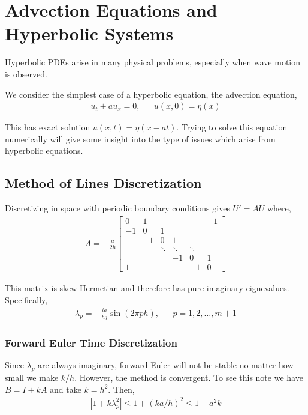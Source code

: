 \documentclass[12pt]{article}
\begin{document}
\section{Advection Equations and Hyperbolic Systems}

Hyperbolic PDEs arise in many physical problems, especially when wave motion is observed. 

We consider the simplest case of a hyperbolic equation, the advection equation,
\begin{align*}
    u_t +a u_x = 0, && u(x,0) = \eta(x)
\end{align*}

This has exact solution \( u(x,t) = \eta(x-at) \). Trying to solve this equation numerically will give some insight into the type of issues which arise from hyperbolic equations.

\subsection{Method of Lines Discretization}
Discretizing in space with periodic boundary conditions gives \( U'=AU \) where,
\begin{align*}
    A = -\frac{a}{2h} 
    \left[\begin{array}{cccccc}
        0 & 1 & & & & -1 \\
        -1 & 0 & 1\\
        &-1 & 0 & 1\\
        & &\ddots &\ddots & \ddots \\
        & & & -1 & 0 & 1 \\
        1 & & & & -1 & 0
    \end{array}\right]
\end{align*}

This matrix is skew-Hermetian and therefore has pure imaginary eignevalues. Specifically,
\begin{align*}
    \lambda_p = -\frac{ia}{hj}\sin(2\pi p h), && p=1,2,\ldots,m+1
\end{align*}

\subsubsection{Forward Euler Time Discretization}
Since \( \lambda_p \) are always imaginary, forward Euler will not be stable no matter how small we make \( k/h \). However, the method is convergent. To see this note we have \( B = I+kA \) and take \( k=h^2 \). Then,
\begin{align*}
    |1+k\lambda_p^2| \leq 1+(ka/h)^2 \leq 1 +a^2k
\end{align*}
\end{document}
